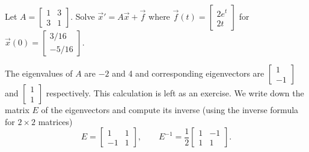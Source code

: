 \begin{example}
Let $A = \left[
\begin{smallmatrix}
1 & 3 \\
3 & 1
\end{smallmatrix} \right]$.
Solve ${\vec{x}}' = A \vec{x} +
\vec{f}$ where $\vec{f}(t) = 
\left[ \begin{smallmatrix}
2e^t \\
2t
\end{smallmatrix} \right]$ for $\vec{x}(0) =
\left[ \begin{smallmatrix}
3/16 \\
-5/16
\end{smallmatrix} \right]$.

The eigenvalues of $A$ are $-2$ and 4 and corresponding eigenvectors
are
$\left[ \begin{smallmatrix}
1 \\
-1
\end{smallmatrix} \right]$ and
$\left[ \begin{smallmatrix}
1 \\
1
\end{smallmatrix} \right]$ respectively.  This calculation is left as an
exercise.  We write down the matrix $E$ of the eigenvectors and compute its
inverse (using the inverse formula for $2 \times 2$ matrices)
\begin{equation*}
E = \begin{bmatrix}
1 & 1 \\
-1 & 1
\end{bmatrix} ,
\qquad
E^{-1}
=
\frac{1}{2}
\begin{bmatrix}
1 & -1 \\
1 & 1
\end{bmatrix} .
\end{equation*}


\end{example}

